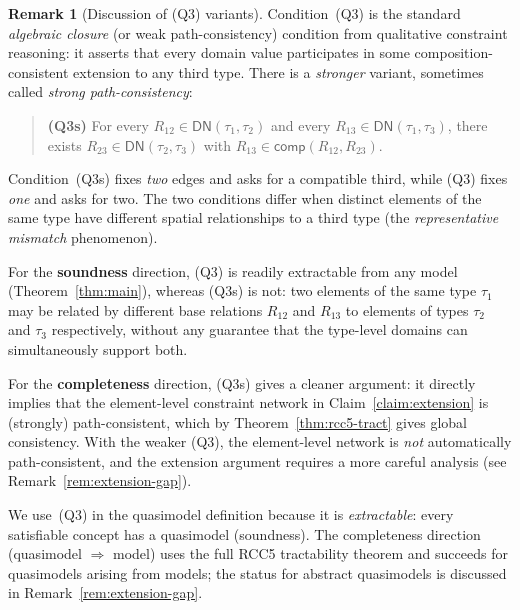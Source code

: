 \documentclass[a4paper,11pt]{article}
\theoremstyle{definition}
\newtheorem{remark}[theorem]{Remark}
\newcommand{\comp}{\ensuremath{\mathsf{comp}}}
\begin{document}
\begin{remark}[Discussion of (Q3) variants]
\label{rem:q3-variants}
Condition~(Q3) is the standard \emph{algebraic closure} (or weak
path-consistency) condition from qualitative constraint reasoning: it
asserts that every domain value participates in some
composition-consistent extension to any third type.  There is a
\emph{stronger} variant, sometimes called \emph{strong
path-consistency}:
\begin{quote}
  \textbf{(Q3s)}\; For every $R_{12} \in \mathsf{DN}(\tau_1, \tau_2)$
  and every $R_{13} \in \mathsf{DN}(\tau_1, \tau_3)$, there exists
  $R_{23} \in \mathsf{DN}(\tau_2, \tau_3)$ with $R_{13} \in
  \comp(R_{12}, R_{23})$.
\end{quote}
Condition~(Q3s) fixes \emph{two} edges and asks for a compatible
third, while (Q3) fixes \emph{one} and asks for two.  The two
conditions differ when distinct elements of the same type have
different spatial relationships to a third type (the
\emph{representative mismatch} phenomenon).

For the \textbf{soundness} direction, (Q3) is readily extractable from
any model (Theorem~\ref{thm:main}), whereas (Q3s) is not: two elements
of the same type $\tau_1$ may be related by different base relations
$R_{12}$ and $R_{13}$ to elements of types $\tau_2$ and $\tau_3$
respectively, without any guarantee that the type-level domains can
simultaneously support both.

For the \textbf{completeness} direction, (Q3s) gives a cleaner
argument: it directly implies that the element-level constraint network
in Claim~\ref{claim:extension} is (strongly) path-consistent, which by
Theorem~\ref{thm:rcc5-tract} gives global consistency.  With the weaker
(Q3), the element-level network is \emph{not} automatically
path-consistent, and the extension argument requires a more careful
analysis (see Remark~\ref{rem:extension-gap}).

We use~(Q3) in the quasimodel definition because it is
\emph{extractable}: every satisfiable concept has a quasimodel
(soundness).  The completeness direction (quasimodel $\Rightarrow$
model) uses the full RCC5 tractability theorem and succeeds for
quasimodels arising from models; the status for abstract quasimodels
is discussed in Remark~\ref{rem:extension-gap}.
\end{remark}
\end{document}
